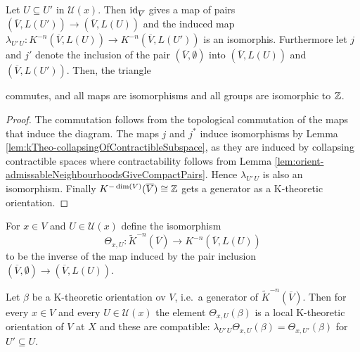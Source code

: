 \begin{lemma}\label{lem:orient-comparisonOfSizes}
Let $U\subseteq U'$ in $\mathcal{U}(x)$. Then $\operatorname{\mathrm{id}}_{\overline{V}}$ gives a map of pairs $(\overline{V},L(U'))\to (\overline{V},L(U))$ and the induced map $\lambda_{U'\,U}:K^{-n}(\overline{V},L(U)) \to K^{-n}(\overline{V},L(U'))$ is an isomorphis. Furthermore let $j$ and $j'$ denote the inclusion of the pair $(\overline{V},\emptyset)$ into $(\overline{V},L(U))$ and $(\overline{V},L(U'))$. Then, the triangle 
\begin{center}
\end{center} commutes, and all maps are isomorphisms and all groups are isomorphic to $\mathbb{Z}$.
\end{lemma}
\begin{proof}
    The commutation follows from the topological commutation of the maps that induce the diagram. The maps $j$ and $j^*$ induce isomorphisms by Lemma \ref{lem:kTheo-collapsingOfContractibleSubspace}, as they are induced by collapsing contractible spaces where contractability follows from Lemma \ref{lem:orient-admissableNeighbourhoodsGiveCompactPairs}. Hence $\lambda_{U'\, U}$ is also an isomorphism. Finally $K^{-\dim(V)}(\overline{V})\cong \mathbb{Z}$ gets a generator as a K-theoretic orientation.
\end{proof}
\begin{definition}
    For $x\in V$ and $U\in \mathcal{U}(x)$ define the isomorphism
    \begin{equation*}
        \Theta_{x,U}:\tilde{K}^{-n}(\overline{V}) \to K^{-n}(\overline{V},L(U))
    \end{equation*} to be the inverse of the map induced by the pair inclusion $(\overline{V},\emptyset)\to (\overline{V},L(U))$.
\end{definition}
\begin{proposition}
    Let $\beta$ be a K-theoretic orientation ov $V$, i.e.\ a generator of $\tilde{K}^{-n}(\overline{V})$. Then for every $x\in V$ and every $U\in \mathcal{U}(x)$ the element $\Theta_{x,U}(\beta)$ is a local K-theoretic orientation of $V$ at $X$ and these are compatible: $\lambda_{U'\,U}\Theta_{x,U}(\beta)=\Theta_{x,U'}(\beta)$ for $U'\subseteq U$.  
\end{proposition}
